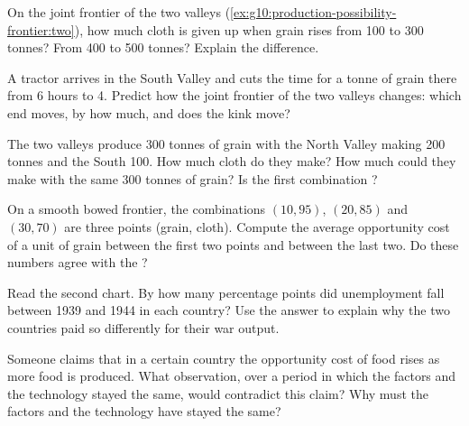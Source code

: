 \begin{exercise}[$\star\star$]\label{exo:g10:production-possibility-frontier:7}
On the joint frontier of the two valleys (\cref{ex:g10:production-possibility-frontier:two}), how much
cloth is given up when grain rises from 100 to 300 tonnes? From 400 to 500 tonnes? Explain the
difference.
\end{exercise}

\begin{exercise}[$\star\star$]\label{exo:g10:production-possibility-frontier:8}
A tractor arrives in the South Valley and cuts the time for a tonne of grain there from 6 hours to 4.
Predict how the joint frontier of the two valleys changes: which end moves, by how much, and does the
kink move?
\end{exercise}

\begin{exercise}[$\star\star$]\label{exo:g10:production-possibility-frontier:9}
The two valleys produce 300 tonnes of grain with the North Valley making 200 tonnes and the South 100.
How much cloth do they make? How much could they make with the same 300 tonnes of grain? Is the first
combination ?
\end{exercise}

\begin{exercise}[$\star\star$]\label{exo:g10:production-possibility-frontier:10}
On a smooth bowed frontier, the combinations $(10, 95)$, $(20, 85)$ and $(30, 70)$ are three points
(grain, cloth). Compute the average opportunity cost of a unit of grain between the first two points and
between the last two. Do these numbers agree with the ?
\end{exercise}

\begin{exercise}[$\star\star$]\label{exo:g10:production-possibility-frontier:11}
Read the second chart. By how many percentage points did unemployment fall between 1939 and 1944 in each
country? Use the answer to explain why the two countries paid so differently for their war output.
\end{exercise}

\begin{exercise}[$\star\star\star$]\label{exo:g10:production-possibility-frontier:12}
Someone claims that in a certain country the opportunity cost of food rises as more food is produced.
What observation, over a period in which the factors and the technology stayed the same, would contradict
this claim? Why must the factors and the technology have stayed the same?
\end{exercise}

